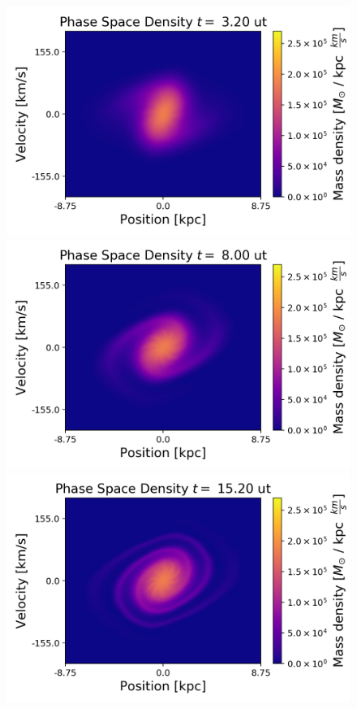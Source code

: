 \begin{figure}[h!]
    \centering
    \includegraphics[scale=0.45]{imag/gauss8.png}
    \includegraphics[scale=0.45]{imag/gauss20.png}
    \includegraphics[scale=0.45]{imag/gauss38.png}

\end{figure}
